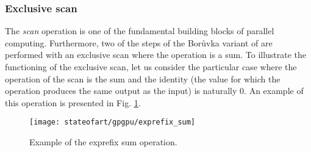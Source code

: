 \subsubsection{Exclusive scan}
\label{sub:scan}


The \emph{scan} operation is one of the fundamental building blocks of parallel computing. 
Furthermore, two of the steps of the Borůvka variant of \cite{Sousa2015} are performed with an exclusive scan where the operation is a sum. 
To illustrate the functioning of the exclusive scan, let us consider the particular case where the operation of the scan is the sum and the identity (the value for which the operation produces the same output as the input) is naturally $0$.
An example of this operation is presented in Fig. \ref{fig:exprefix sum}.

\begin{figure}[hbtp]
\centering
\texttt{[image: stateofart/gpgpu/exprefix\_sum]}
\caption{Example of the exprefix sum operation.}
\label{fig:exprefix sum}
\end{figure}

